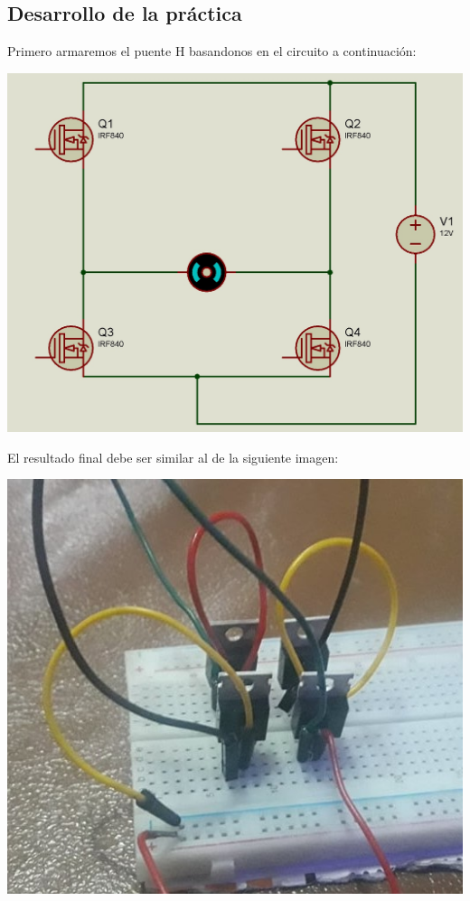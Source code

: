 \documentclass[12pt,a4paper]{article}
\begin{document}
\begin{flushleft}
\subsection{Desarrollo de la práctica}
Primero armaremos el puente H basandonos en el circuito a continuación:\linebreak
\begin{center}
\includegraphics[scale=0.22]{imagenes/simu1.JPG}\linebreak
\end{center}
El resultado final debe ser similar al de la siguiente imagen:\linebreak
\begin{center}
\includegraphics[scale=1]{imagenes/fefe2.JPG}\linebreak

\end{center}
\end{flushleft}
\end{document}
